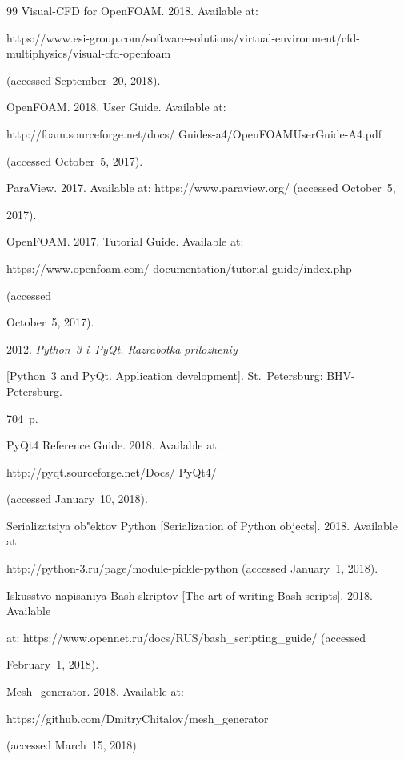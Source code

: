 {{\begin{thebibliography}{99}
Visual-CFD for OpenFOAM. 2018. Available at: {\sf  


https://www.esi-group.com/\linebreak software-solutions/virtual-environment/cfd-multiphysics/visual-cfd-openfoam} 


(accessed September~20, 2018).




OpenFOAM.  2018. User Guide. Available at: {\sf 


http://foam.sourceforge.net/docs/ Guides-a4/OpenFOAMUserGuide-A4.pdf} 


(accessed October~5, 2017).




ParaView. 2017. Available at: {\sf https://www.paraview.org/} (accessed October~5, 


2017).




OpenFOAM.  2017. Tutorial Guide. Available at:  {\sf 


https://www.openfoam.com/ documentation/tutorial-guide/index.php} (accessed 


October~5, 2017).




 2012. \textit{Python~3 i~PyQt. Razrabotka prilozheniy} 


[Python~3 and PyQt. Application development]. St.\ Petersburg: BHV-Petersburg. 


704~p.




PyQt4 Reference Guide. 2018. Available at: {\sf 


http://pyqt.sourceforge.net/Docs/ PyQt4/}  (accessed January~10, 2018).




Serializatsiya ob"ektov Python [Serialization of Python objects]. 2018. Available at: 


{\sf http://python-3.ru/page/module-pickle-python} (accessed January~1, 2018).




Iskusstvo napisaniya Bash-skriptov [The art of writing Bash scripts]. 2018. Available 


at: {\sf https://www.opennet.ru/docs/RUS/bash\_scripting\_guide/} (accessed 


February~1, 2018).




Mesh\_generator. 2018. Available at: {\sf 


https://github.com/DmitryChitalov/mesh\_\linebreak generator} (accessed March~15, 2018).


\end{thebibliography}


} }








